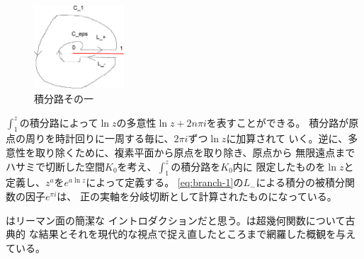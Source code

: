\begin{figure}[htbp] %
	\begin{center}
		\includegraphics[width=0.3\textwidth]{fig/contour-1.eps}
	\end{center}
	\caption{積分路その一}\label{fig:積分路その一}
\end{figure} %

$\int_1^z$の積分路によって$\ln z$の多意性$\ln z+2n\pi i$を表すことができる。
積分路が原点の周りを時計回りに一周する毎に、$2\pi i$ずつ$\ln z$に加算されて
いく。逆に、多意性を取り除くために、複素平面から原点を取り除き、原点から
無限遠点までハサミで切断した空間$K_0$を考え、$\int_1^z$の積分路を$K_0$内に
限定したものを$\ln z$と定義し、$z^a$を$e^{a\ln z}$によって定義する。
\eqref{eq:branch-1}の$L_-$による積分の被積分関数の因子$e^{\pi i}$は、
正の実軸を分岐切断として計算されたものになっている。

\cite{hb3.s6:online}\cite{www.e5:online}はリーマン面の簡潔な
イントロダクションだと思う。\cite{www.s3:online}は超幾何関数について古典的
な結果とそれを現代的な視点で捉え直したところまで網羅した概観を与えている。
